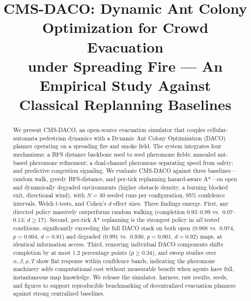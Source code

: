 \documentclass[conference]{IEEEtran}
\begin{document}
\title{CMS-DACO: Dynamic Ant Colony Optimization for Crowd Evacuation\\under Spreading Fire --- An Empirical Study Against\\Classical Replanning Baselines}

\author{
}

\maketitle

\begin{abstract}
We present CMS-DACO, an open-source evacuation simulator that couples cellular-automata pedestrian dynamics with a Dynamic Ant Colony Optimization (DACO) planner operating on a spreading fire and smoke field. The system integrates four mechanisms: a BFS distance backbone used to seed pheromone fields; annealed ant-based pheromone refinement; a dual-channel pheromone separating speed from safety; and predictive congestion signaling. We evaluate CMS-DACO against three baselines---random walk, greedy BFS-distance, and per-tick replanning hazard-aware A*---on open and dynamically degraded environments (higher obstacle density, a burning blocked exit, directional wind), with $N{=}30$ seeded runs per configuration, 95\% confidence intervals, Welch $t$-tests, and Cohen's $d$ effect sizes. Three findings emerge. First, any directed policy massively outperforms random walking (completion $0.93$--$0.99$ vs.\ $0.07$--$0.13$; $d\geq 17$). Second, per-tick A* replanning is the strongest policy in \emph{all} tested conditions, significantly exceeding the full DACO stack on both open ($0.998$ vs.\ $0.974$, $p{=}0.004$, $d{=}0.81$) and degraded ($0.991$ vs.\ $0.930$, $p{=}0.001$, $d{=}0.92$) maps, at identical information access. Third, removing individual DACO components shifts completion by at most $1.2$ percentage points ($p\geq0.34$), and sweep studies over $\alpha,\beta,\rho,T$ show flat response within confidence bands, indicating the pheromone machinery adds computational cost without measurable benefit when agents have full, instantaneous map knowledge. We release the simulator, harness, raw results, seeds, and figures to support reproducible benchmarking of decentralized evacuation planners against strong centralized baselines.
\end{abstract}
\end{document}
